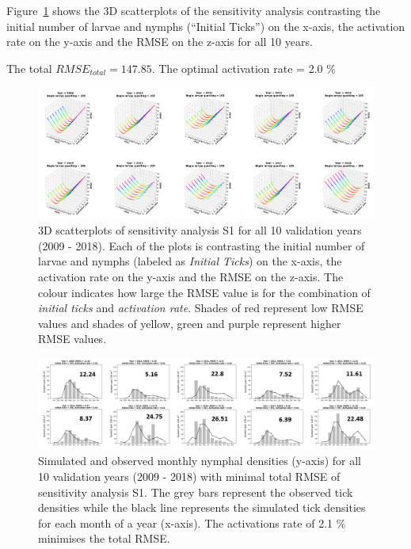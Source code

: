 \documentclass[a4paper, 11pt]{scrartcl}
\begin{document}
Figure~\ref{fig:initial_ticks_with_beech_error} shows the 3D scatterplots of the sensitivity analysis contrasting the initial number of larvae and nymphs (``Initial Ticks'') on
the x-axis, the activation rate on the y-axis and the RMSE on the z-axis for all 10 years.

The total $RMSE_{total} = 147.85$. The optimal activation rate = 2.0 \%


\begin{figure}[h!]
\centering
\includegraphics[width=1.0\textwidth]{figures/initial_ticks_with_beech_error}
\caption{3D scatterplots of sensitivity analysis S1 for all 10 validation years (2009 - 2018). Each of the plots is contrasting the initial number of larvae and nymphs
(labeled as \textit{Initial Ticks}) on the x-axis, the activation rate on the y-axis and the RMSE on the z-axis. The colour indicates how large the RMSE value is for the
combination of \textit{initial ticks} and \textit{activation rate}. Shades of red represent low RMSE values and shades of yellow, green and purple represent higher RMSE values.}
\label{fig:initial_ticks_with_beech_error}
\end{figure}

\begin{figure}[h!]
\centering
\includegraphics[width=1.0\textwidth]{figures/initial_ticks_with_beech}
\caption{Simulated and observed monthly nymphal densities (y-axis) for all 10 validation years (2009 - 2018) with minimal total RMSE of sensitivity analysis S1. The grey bars
represent the observed tick densities while the black line represents the simulated tick densities for each month of a year (x-axis). The activations rate of 2.1 \% minimises
the total RMSE.}
\label{fig:initial_ticks_with_beech}
\end{figure}
\end{document}
